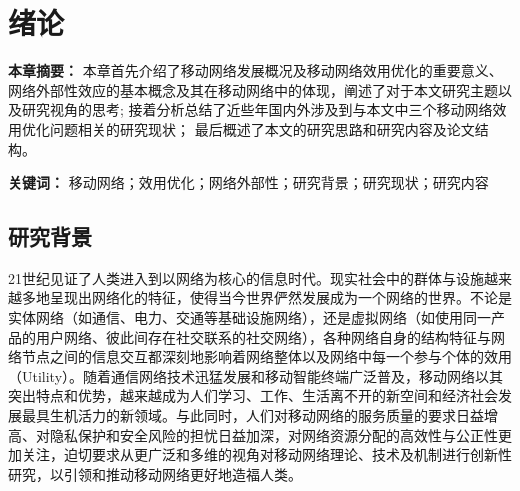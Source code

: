 \chapter{绪论}

\textbf{本章摘要：} 本章首先介绍了移动网络发展概况及移动网络效用优化的重要意义、网络外部性效应的基本概念及其在移动网络中的体现，阐述了对于本文研究主题以及研究视角的思考; 
接着分析总结了近些年国内外涉及到与本文中三个移动网络效用优化问题相关的研究现状；
最后概述了本文的研究思路和研究内容及论文结构。

\textbf{关键词：} 移动网络；效用优化；网络外部性；研究背景；研究现状；研究内容


\section{研究背景}


21世纪见证了人类进入到以网络为核心的信息时代。现实社会中的群体与设施越来越多地呈现出网络化的特征，使得当今世界俨然发展成为一个网络的世界。不论是实体网络（如通信、电力、交通等基础设施网络），还是虚拟网络（如使用同一产品的用户网络、彼此间存在社交联系的社交网络），各种网络自身的结构特征与网络节点之间的信息交互都深刻地影响着网络整体以及网络中每一个参与个体的效用（Utility）。随着通信网络技术迅猛发展和移动智能终端广泛普及，移动网络以其突出特点和优势，越来越成为人们学习、工作、生活离不开的新空间和经济社会发展最具生机活力的新领域。与此同时，人们对移动网络的服务质量的要求日益增高、对隐私保护和安全风险的担忧日益加深，对网络资源分配的高效性与公正性更加关注，迫切要求从更广泛和多维的视角对移动网络理论、技术及机制进行创新性研究，以引领和推动移动网络更好地造福人类。



